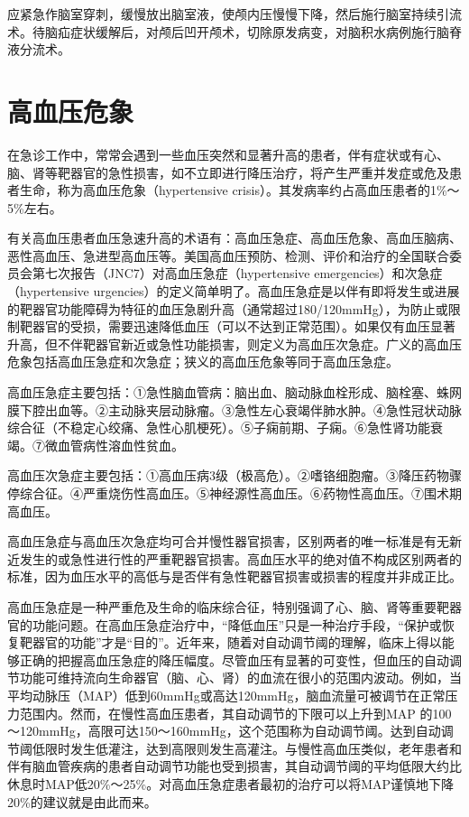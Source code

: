 应紧急作脑室穿刺，缓慢放出脑室液，使颅内压慢慢下降，然后施行脑室持续引流术。待脑疝症状缓解后，对颅后凹开颅术，切除原发病变，对脑积水病例施行脑脊液分流术。
\protect\hypertarget{text00108.html}{}{}

\chapter{高血压危象}

在急诊工作中，常常会遇到一些血压突然和显著升高的患者，伴有症状或有心、脑、肾等靶器官的急性损害，如不立即进行降压治疗，将产生严重并发症或危及患者生命，称为高血压危象（hypertensive
crisis）。其发病率约占高血压患者的1\%～5\%左右。

有关高血压患者血压急速升高的术语有：高血压急症、高血压危象、高血压脑病、恶性高血压、急进型高血压等。美国高血压预防、检测、评价和治疗的全国联合委员会第七次报告（JNC7）对高血压急症（hypertensive
emergencies）和次急症（hypertensive
urgencies）的定义简单明了。高血压急症是以伴有即将发生或进展的靶器官功能障碍为特征的血压急剧升高（通常超过180/120mmHg），为防止或限制靶器官的受损，需要迅速降低血压（可以不达到正常范围）。如果仅有血压显著升高，但不伴靶器官新近或急性功能损害，则定义为高血压次急症。广义的高血压危象包括高血压急症和次急症；狭义的高血压危象等同于高血压急症。

高血压急症主要包括：①急性脑血管病：脑出血、脑动脉血栓形成、脑栓塞、蛛网膜下腔出血等。②主动脉夹层动脉瘤。③急性左心衰竭伴肺水肿。④急性冠状动脉综合征（不稳定心绞痛、急性心肌梗死）。⑤子痫前期、子痫。⑥急性肾功能衰竭。⑦微血管病性溶血性贫血。

高血压次急症主要包括：①高血压病3级（极高危）。②嗜铬细胞瘤。③降压药物骤停综合征。④严重烧伤性高血压。⑤神经源性高血压。⑥药物性高血压。⑦围术期高血压。

高血压急症与高血压次急症均可合并慢性器官损害，区别两者的唯一标准是有无新近发生的或急性进行性的严重靶器官损害。高血压水平的绝对值不构成区别两者的标准，因为血压水平的高低与是否伴有急性靶器官损害或损害的程度并非成正比。

高血压急症是一种严重危及生命的临床综合征，特别强调了心、脑、肾等重要靶器官的功能问题。在高血压急症治疗中，“降低血压”只是一种治疗手段，“保护或恢复靶器官的功能”才是“目的”。近年来，随着对自动调节阈的理解，临床上得以能够正确的把握高血压急症的降压幅度。尽管血压有显著的可变性，但血压的自动调节功能可维持流向生命器官（脑、心、肾）的血流在很小的范围内波动。例如，当平均动脉压（MAP）低到60mmHg或高达120mmHg，脑血流量可被调节在正常压力范围内。然而，在慢性高血压患者，其自动调节的下限可以上升到MAP
的100～120mmHg，高限可达150～160mmHg，这个范围称为自动调节阈。达到自动调节阈低限时发生低灌注，达到高限则发生高灌注。与慢性高血压类似，老年患者和伴有脑血管疾病的患者自动调节功能也受到损害，其自动调节阈的平均低限大约比休息时MAP低20\%～25\%。对高血压急症患者最初的治疗可以将MAP谨慎地下降20\%的建议就是由此而来。

